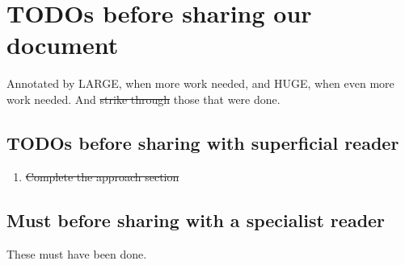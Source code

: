 \documentclass[acmsmall,review,anonymous]{acmart}\settopmatter{printfolios=true}
\begin{document}
\section{TODOs before sharing our document}

Annotated by LARGE, when more work needed, and HUGE, when even more work needed.
 And \st{strike through} those that were done.
 
\subsection{TODOs before sharing with superficial reader}

 
\begin{enumerate}
\item
\st{Complete the approach section}
\end{enumerate}
 
 \subsection{Must before sharing with a specialist reader}
 These must have been done.  
 
\end{document}
